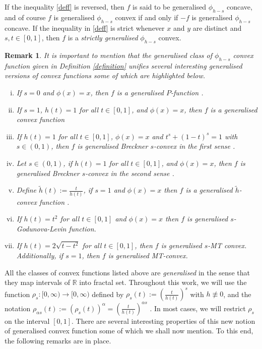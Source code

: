 \documentclass[10pt]{article}
\newtheorem{rmk}[theo]{Remark}
\begin{document}
If the inequality \eqref{deff} is reversed, then $f$ is said to be generalised $\phi_{h-s}$ concave, and of course $f$ is generalised $\phi_{h-s}$ convex if and only if $-f$ is generalised $\phi_{h-s}$ concave. If the inequality in \eqref{deff} is strict whenever $x$ and $y$ are distinct and $s,t\in[0,1]$, then $f$ is a {\it strictly generalised} $\phi_{h-s}$ convex.
\begin{rmk} \label{r1}
It is important to mention that the generalised class of $\phi_{h-s}$ convex function given in Definition \ref{definition} unifies several interesting generalised versions of convex functions \cite{dragomir, pengxu, mo, sun, tomar} some of which are highlighted below.
\begin{enumerate}[(i)]
\item If $s=0$ and $\phi(x)=x$, then $f$ is a generalised $P$-function \cite{dragomir}.
\item If $s=1$, $h(t)=1$ for all $t\in [0,1]$, and $\phi(x)=x$, then $f$ is a generalised convex function \cite{tomar}
\item If $h(t)=1$ for all $t\in [0,1]$,  $\phi(x)=x$ and $t^{s}+(1-t)^s=1$ with $s\in(0,1)$,  then $f$ is generalised Breckner $s$-convex in the first sense \cite{mo}. 
\item Let $s\in(0,1)$, if $h(t)=1$ for all $t\in [0,1]$,        and $\phi(x)=x$, then $f$ is generalised Breckner $s$-convex in the second sense \cite{mo}.
\item Define $\tilde{h}(t):= \frac{t}{h(t)}$, if $s=1$ and $\phi(x)=x$ then $f$ is a generalised $\tilde h$-convex function \cite{pengxu}.
\item If $h(t)=t^2$ for all $t\in [0,1]$ and $\phi(x)=x$ then $f$ is generalised $s$-Godunova-Levin function.
\item If $h(t)=2\sqrt{t-t^2}$ for all $t\in [0,1]$, then $f$ is generalised $s$-MT convex. Additionally, if $s=1$, then $f$ is generalised MT-convex.

\end{enumerate}

\end{rmk}
All the classes of convex functions listed above are \textit{generalised} in the sense that they map intervals of $\mathbb{R}$ into fractal set. Throughout this work, we will use the function $\rho_{ s}:[0,\infty)\rightarrow[0,\infty)$ defined by $\rho_s(t):=\left(\frac{t}{h(t)}\right)^{ s}$ with $h\not\equiv 0$, and the notation $\rho_{\alpha s}(t):= (\rho_s(t))^\alpha=\left(\frac{t}{h(t)}\right)^{\alpha s}$ . In most cases, we will restrict $\rho_{s}$ on the interval $[0,1]$. There are several interesting properties of this new notion of generalised convex function some of which we shall now mention. To this end, the following remarks are in place.
\end{document}
